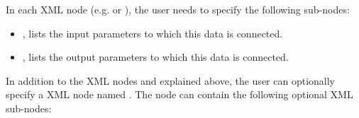 \vspace{-5mm}
In each XML node (e.g.  or ), the user
needs to specify the following sub-nodes:
\begin{itemize}
  \item {},  lists
  the input parameters to which this data is connected.
  \item {},  lists
  the output parameters to which this data is connected.
\end{itemize}

In addition to the XML nodes  and  explained above, the user
can optionally specify a XML node named  . The   node can
contain the following optional XML sub-nodes:

